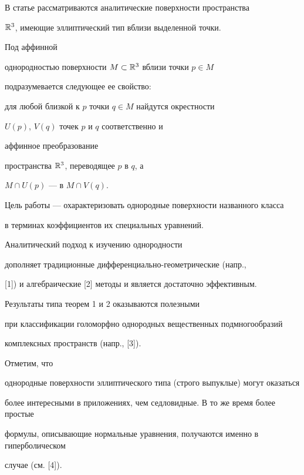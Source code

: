 \label{begin}





В статье рассматриваются аналитические поверхности пространства


$\Bbb R^3$, имеющие эллиптический тип вблизи выделенной точки.





Под аффинной


однородностью поверхности $M \subset \Bbb R^3$ вблизи точки $p \in M$


подразумевается следующее ее свойство:


для любой близкой к $p$ точки $q \in M$ найдутся окрестности


$U(p)$, $V(q)$ точек $p$ и $q$ соответственно и


аффинное преобразование


пространства $\Bbb R^3$, переводящее $p$ в $q$, а


$M \cap U(p)$ --- в $M \cap V(q)$.





Цель работы --- охарактеризовать однородные поверхности названного класса


в терминах коэффициентов их специальных уравнений.


Аналитический подход к изучению однородности


дополняет традиционные дифференциально-геометрические (напр.,


[1]) и алгебраические [2] методы и является достаточно эффективным.


Результаты типа теорем 1 и 2 оказываются полезными


при классификации голоморфно однородных вещественных подмногообразий


комплексных пространств (напр., [3]).





Отметим, что


однородные поверхности эллиптического типа (строго выпуклые) могут оказаться


более интересными в приложениях, чем седловидные. В то же время более простые


формулы, описывающие нормальные уравнения, получаются именно в гиперболическом


случае (см. [4]).





